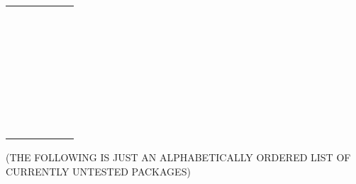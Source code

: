 \begin{Schunk}
\begin{table}
\begin{tabular}[t]{llrrrr}
\addlinespace
 &  &  &  &  & \\
 &  &  &  &  & \\
 &  &  &  &  & \\
 &  &  &  &  & \\
 &  &  &  &  & \\
\addlinespace
 &  &  &  &  & \\
 &  &  &  &  & \\
 &  &  &  &  & \\
 &  &  &  &  & \\
 &  &  &  &  & \\
\addlinespace
 &  &  &  &  & \\
 &  &  &  &  & \\
 &  &  &  &  & \\
 &  &  &  &  & \\
 &  &  &  &  & \\
\addlinespace
 &  &  &  &  & \\
 &  &  &  &  & \\
 &  &  &  &  & \\
 &  &  &  &  & \\
 &  &  &  &  & \\
\addlinespace
 &  &  &  &  & \\
 &  &  &  &  & \\
 &  &  &  &  & \\
 &  &  &  &  & \\
 &  &  &  &  & \\
\addlinespace
 &  &  &  &  & \\
 &  &  &  &  & \\
 &  &  &  &  & \\
 &  &  &  &  & \\
 &  &  &  &  & \\
\addlinespace
 &  &  &  &  & \\
\bottomrule
\end{tabular}
\end{table}

\end{Schunk}

(THE FOLLOWING IS JUST AN ALPHABETICALLY ORDERED LIST OF CURRENTLY
UNTESTED PACKAGES)

